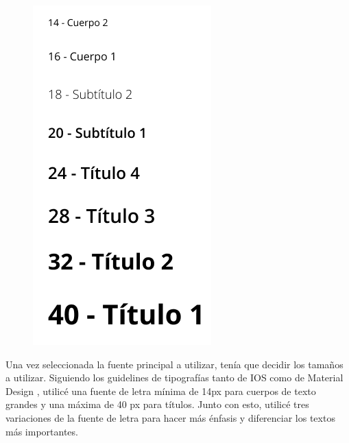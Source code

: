 \begin{figure}
    \centering
    \includegraphics[width=0.9\linewidth]{diseno/app/presentacion/tamano.png}
\end{figure}

Una vez seleccionada la fuente principal a utilizar, tenía que decidir los tamaños a utilizar. Siguiendo los guidelines de tipografías tanto de IOS \cite{typ-ios} como de Material Design \cite{typ-android}, utilicé una fuente de letra mínima de 14px para cuerpos de texto grandes y una máxima de 40 px para títulos. Junto con esto, utilicé tres variaciones de la fuente de letra para hacer más énfasis y diferenciar los textos más importantes. 

